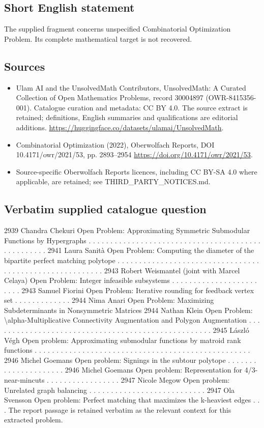 \documentclass[11pt]{article}
\begin{document}
\subsection{Short English statement}
The supplied fragment concerns unspecified Combinatorial Optimization Problem. Its complete mathematical target is not recovered.
\subsection{Sources}
\begin{itemize}
\item[S1] Ulam AI and the UnsolvedMath Contributors, UnsolvedMath: A Curated Collection of Open Mathematics Problems, record 30004897 (OWR-8415356-001). Catalogue curation and metadata: CC BY 4.0. The source extract is retained; definitions, English summaries and qualifications are editorial additions.
\url{https://huggingface.co/datasets/ulamai/UnsolvedMath}.
\item[S2] Combinatorial Optimization (2022), Oberwolfach Reports, DOI 10.4171/owr/2021/53, pp. 2893--2954
\url{https://doi.org/10.4171/owr/2021/53}.
\item Source-specific Oberwolfach Reports licences, including CC BY-SA 4.0 where applicable, are retained; see THIRD\_PARTY\_NOTICES.md.
\end{itemize}
\subsection{Verbatim supplied catalogue question}
2939 Chandra Chekuri Open Problem: Approximating Symmetric Submodular Functions by Hypergraphs . . . . . . . . . . . . . . . . . . . . . . . . . . . . . . . . . . . . . . . . . . . . . . . . . . 2941 Laura Sanità Open Problem: Computing the diameter of the bipartite perfect matching polytope . . . . . . . . . . . . . . . . . . . . . . . . . . . . . . . . . . . . . . . . . . . . . . . . . . . . . . . . 2943 Robert Weismantel (joint with Marcel Celaya) Open Problem: Integer infeasible subsystems . . . . . . . . . . . . . . . . . . . . . . . . 2943 Samuel Fiorini Open Problem: Iterative rounding for feedback vertex set . . . . . . . . . . . . . 2944 Nima Anari Open Problem: Maximizing Subdeterminants in Nonsymmetric Matrices 2944 Nathan Klein Open Problem: \textbackslash{}alpha-Multiplicative Connectivity Augmentation and Polygon Augmentation . . . . . . . . . . . . . . . . . . . . . . . . . . . . . . . . . . . . . . . . . . . . . . . . . . . 2945 László Végh Open problem: Approximating submodular functions by matroid rank functions . . . . . . . . . . . . . . . . . . . . . . . . . . . . . . . . . . . . . . . . . . . . . . . . . . 2946 Michel Goemans Open problem: Signings in the subtour polytope . . . . . . . . . . . . . . . . . . . . . 2946 Michel Goemans Open problem: Representation for 4/3-near-mincuts . . . . . . . . . . . . . . . . . 2947 Nicole Megow Open problem: Unrelated graph balancing . . . . . . . . . . . . . . . . . . . . . . . . . . . 2947 Ola Svensson Open problem: Perfect matching that maximizes the k-heaviest edges . . . The report passage is retained verbatim as the relevant context for this extracted problem.
\end{document}
